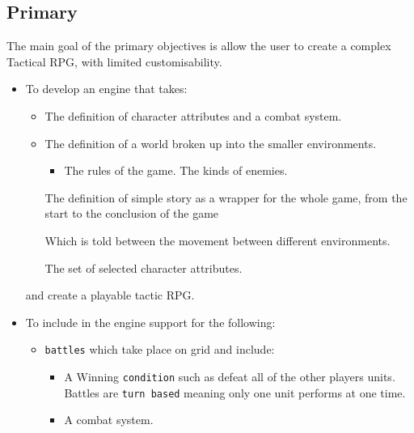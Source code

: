 \subsection{Primary}
\label{primary}
The main goal of the primary objectives is allow the user to create a complex Tactical RPG, with limited customisability.  
\begin{itemize}
\item To develop an engine that takes:
\begin{itemize}

 \item The definition of character attributes and a combat system.
	\item The definition of a world broken up into the smaller environments.
	\begin{itemize}
		\item The rules of the game.
		\cross The kinds of enemies.
	\end{itemize}
	
	\tick The definition of simple story as a wrapper for the whole game, from the start to the conclusion of the game
	\begin{itemize}
		\cross Which is told between the movement between different environments.
	\end{itemize}
	                        
	\cross The set of selected character attributes.
	
\end{itemize}
and create a playable tactic RPG.

\item To include in the engine support for the following:
\begin{itemize}
	\tick \texttt{units} with a fixed set of associated attributes such as:
	\begin{itemize}
		\tick Hit-points (which represent the health of the unit).
		\tick Strength.
		\tick Defence.
		\tick Move (The number of tiles the unit can move each turn).
	\end{itemize}
	
	\item \texttt{battles} which take place on grid and include:
	\begin{itemize}
		\tick  A set number of \texttt{units} for each player.
		\item  A Winning \texttt{condition} such as defeat all of the other players units.
		\tick  Battles are \texttt{turn based} meaning only one unit performs at one time.   
		\item  A combat system. \marginpar{\textbf{Nearly}}
	\end{itemize}
	

\end{itemize}
\end{itemize}
